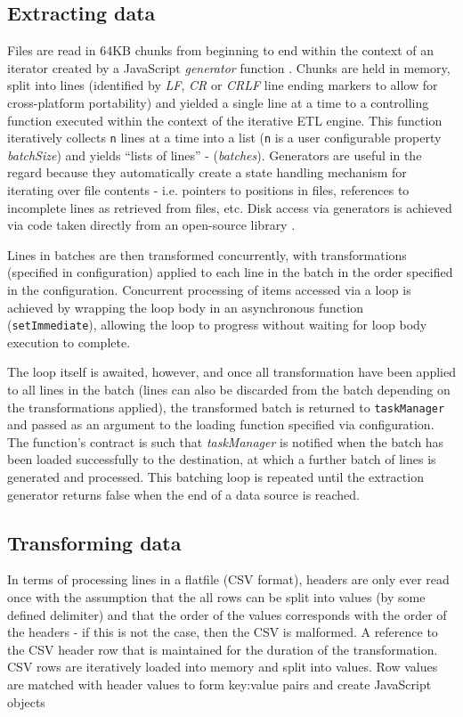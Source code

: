 

\subsection{Extracting data}
Files are read in 64KB chunks from beginning to end within the context of an iterator created by a JavaScript \textit{generator} function \cite{mozillaGenerators}. Chunks are held in memory, split into lines (identified by \textit{LF}, \textit{CR} or \textit{CRLF} line ending markers to allow for cross-platform portability) and yielded a single line at a time to a controlling function executed within the context of the iterative ETL engine. This function iteratively collects \texttt{n} lines at a time into a list (\texttt{n} is a user configurable property \textit{batchSize}) and yields ``lists of lines'' - (\textit{batches}). Generators are useful in the regard because they automatically create a state handling mechanism for iterating over file contents - i.e. pointers to positions in files, references to incomplete lines as retrieved from files, etc. Disk access via generators is achieved via code taken directly from an open-source library \cite{bower16}.

Lines in batches are then transformed concurrently, with transformations (specified in configuration) applied to each line in the batch in the order specified in the configuration. Concurrent processing of items accessed via a loop is achieved by wrapping the loop body in an asynchronous function (\texttt{setImmediate}), allowing the loop to progress without waiting for loop body execution to complete.

The loop itself is awaited, however, and once all transformation have been applied to all lines in the batch (lines can also be discarded from the batch depending on the transformations applied), the transformed batch is returned to \texttt{taskManager} and passed as an argument to the loading function specified via configuration. The function's contract is such that \textit{taskManager} is notified when the batch has been loaded successfully to the destination, at which a further batch of lines is generated and processed. This batching loop is repeated until the extraction generator returns false when the end of a data source is reached.

\subsection{Transforming data}
In terms of processing lines in a flatfile (CSV format), headers are only ever read once with the assumption that the all rows can be split into values (by some defined delimiter) and that the order of the values corresponds with the order of the headers - if this is not the case, then the CSV is malformed. A reference to the CSV header row that is maintained for the duration of the transformation. CSV rows are iteratively loaded into memory and split into values. Row values are matched with header values to form key:value pairs and create JavaScript objects

